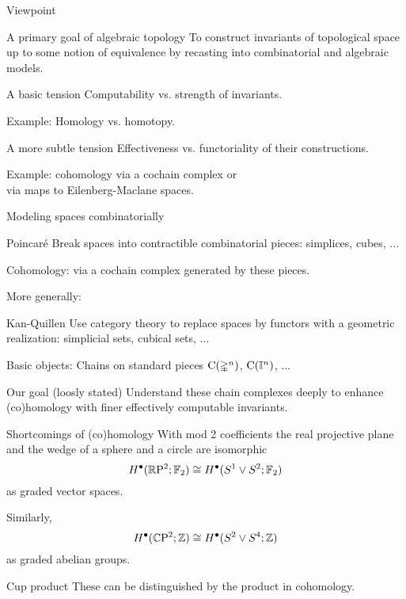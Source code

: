 
\begin{frame}{Viewpoint}
	\vskip -10pt
	\begin{block}{A primary goal of algebraic topology}
		To construct invariants of topological space up to some notion of equivalence by recasting into combinatorial and algebraic models.
	\end{block}

	\medskip\pause
	\begin{block}{A basic tension}
		Computability vs. strength of invariants.
	\end{block}

	\medskip \textcolor{pblue}{Example:}
	Homology vs. homotopy.

	\medskip\pause
	\begin{block}{A more subtle tension}
		Effectiveness vs. functoriality of their constructions.
	\end{block}

	\medskip \textcolor{pblue}{Example:}
	cohomology via a cochain complex or \\
	\hspace*{40pt} via maps to Eilenberg-Maclane spaces.
\end{frame}

\begin{frame}{Modeling spaces combinatorially}
	\pause
	\begin{block}{Poincar\'{e}}
		Break spaces into contractible combinatorial pieces: simplices, cubes, ...
	\end{block}

	\pause \textcolor{pblue}{Cohomology:}
	via a cochain complex generated by these pieces.

	\medskip\pause	More generally:
	\begin{block}{Kan-Quillen}
		Use category theory to replace spaces by functors with a geometric realization: simplicial sets, cubical sets, ...
	\end{block}

	\pause \textcolor{pblue}{Basic objects:}
	Chains on standard pieces $\operatorname{C}(\mathbb{\Delta}^n)$, $\operatorname{C}(\mathbb{I}^n)$, ...

	\smallskip\pause
	\begin{block}{Our goal (loosly stated)}
		Understand these chain complexes deeply to enhance (co)homology with finer effectively computable invariants.
	\end{block}
\end{frame}

\begin{frame}{Shortcomings of (co)homology}
	\pause With mod 2 coefficients the real projective plane and the wedge of a sphere and a circle are isomorphic
	\[
	H^\bullet(\mathbb{R} \mathrm{P}^2; {\mathbb{F}_2}) \cong H^\bullet(S^1 \vee S^2; {\mathbb{F}_2})
	\]
	as graded vector spaces.

	\bigskip\pause
	Similarly,
	\[
	H^\bullet(\mathbb{C} \mathrm{P}^2; \mathbb{Z}) \cong H^\bullet(S^2 \vee S^4; \mathbb{Z})
	\]
	as graded abelian groups.

	\bigskip\pause
	\begin{block}{Cup product}
		These can be distinguished by the product in cohomology.
	\end{block}
\end{frame}
